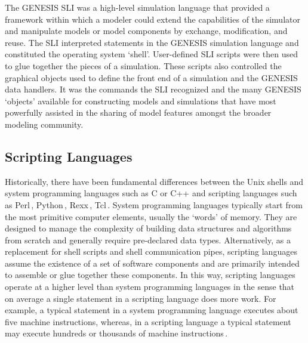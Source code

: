 \documentclass[10pt]{article}
\begin{document}
The GENESIS SLI was a high-level simulation language that provided a
framework within which a modeler could extend the capabilities of the
simulator and manipulate models or model components by exchange,
modification, and reuse. The SLI interpreted statements in the GENESIS
simulation language and constituted the operating system `shell'.
User-defined SLI scripts were then used to glue together the pieces of
a simulation. These scripts also controlled the graphical objects used
to define the front end of a simulation and the GENESIS data handlers.
It was the commands the SLI recognized and the many GENESIS `objects'
available for constructing models and simulations that have most powerfully
assisted in the sharing of model features amongst the broader modeling
community.

\subsection*{Scripting Languages}

Historically, there have been fundamental differences between the Unix
shells and system programming languages such as C or C++ and scripting
languages such as Perl\,\cite{wall99:_perl_progr_refer_guide},
Python\,\cite{martelli06:_python_nutsh},
Rexx\,\cite{ohara88:_moder_progr_using_rexx},
Tcl\,\cite{ousterhout94:_tcl_tk_toolk}.  System
programming languages typically start from the most primitive computer
elements, usually the `words' of memory. They are designed to manage
the complexity of building data structures and algorithms from scratch
and generally require pre-declared data types.  Alternatively, as a
replacement for shell scripts and shell communication pipes, scripting
languages assume the existence of a set of software components and are
primarily intended to assemble or glue together these components.
In this way, scripting languages operate at a higher level than system
programming languages in the sense that on average a single statement
in a scripting language does more work.  For example, a typical statement in a system
programming language executes about five machine instructions, whereas,
in a scripting language a typical statement may execute hundreds or thousands of machine instructions\,\cite{ousterhout98:_scrip}.
\end{document}

